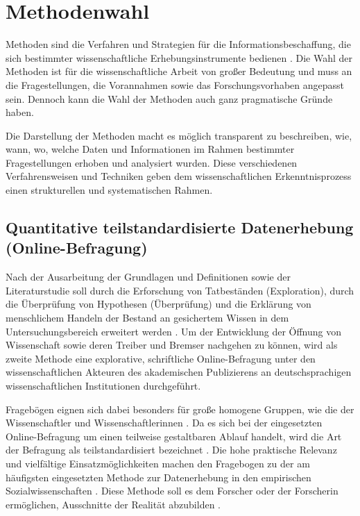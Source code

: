 \section{Methodenwahl}

Methoden sind die Verfahren und Strategien für die Informationsbeschaffung, die sich bestimmter wissenschaftliche Erhebungsinstrumente bedienen \cite[:309]{Kromrey_2013}. Die Wahl der Methoden ist für die wissenschaftliche Arbeit von großer Bedeutung und muss an die Fragestellungen, die Vorannahmen sowie das Forschungsvorhaben angepasst sein. Dennoch kann die Wahl der Methoden auch ganz pragmatische Gründe haben.

Die Darstellung der Methoden macht es möglich transparent zu beschreiben, wie, wann, wo, welche Daten und Informationen im Rahmen bestimmter Fragestellungen erhoben und analysiert wurden. Diese verschiedenen Verfahrensweisen und Techniken geben dem wissenschaftlichen Erkenntnisprozess einen strukturellen und systematischen Rahmen.

\subsection{Quantitative teilstandardisierte Datenerhebung (Online-Befragung)}

Nach der Ausarbeitung der Grundlagen und Definitionen sowie der Literaturstudie soll durch die Erforschung von Tatbeständen (Exploration), durch die Überprüfung von Hypothesen (Überprüfung) \cite{Raab-Steiner_2012} und die Erklärung von menschlichem Handeln \cite{Atteslander_2008} der Bestand an gesichertem Wissen in dem Untersuchungsbereich erweitert werden \cite{Bortz_2006a}. Um der Entwicklung der Öffnung von Wissenschaft sowie deren Treiber und Bremser nachgehen zu können, wird als zweite Methode eine explorative, schriftliche Online-Befragung unter den wissenschaftlichen Akteuren des akademischen Publizierens an deutschsprachigen wissenschaftlichen Institutionen durchgeführt.

Fragebögen eignen sich dabei besonders für große homogene Gruppen, wie die der Wissenschaftler und Wissenschaftlerinnen \cite{Bortz_2006}. Da es sich bei der eingesetzten Online-Befragung um einen teilweise gestaltbaren Ablauf handelt, wird die Art der Befragung als teilstandardisiert bezeichnet \cite{Raab-Steiner_2012}. Die hohe praktische Relevanz und vielfältige Einsatzmöglichkeiten machen den Fragebogen zu der am häufigsten eingesetzten Methode zur Datenerhebung in den empirischen Sozialwissenschaften \cite{Raab-Steiner_2012}. Diese Methode soll es dem Forscher oder der Forscherin ermöglichen, Ausschnitte der Realität abzubilden \cite{Raab-Steiner_2012}.

